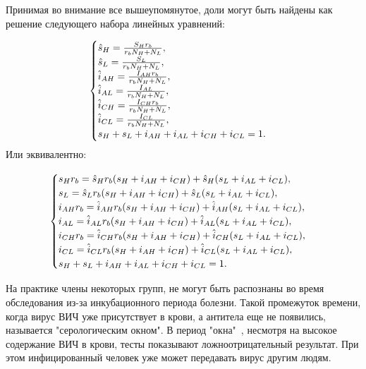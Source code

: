 \documentclass[a4paper]{report}
\begin{document}
	
	Принимая во внимание все вышеупомянутое, доли могут быть найдены как решение следующего набора линейных уравнений:

	\begin{gather}
		\begin{cases}	
	\hat{s}_H = {{{S_H} r_b} \over {r_b N_H + N_L}}, \notag \\
	\hat{s}_L = {{{S_L}} \over {r_b N_H + N_L}}, \notag \\
	\hat{i}_{AH} = {{{I_{AH}} r_b} \over {r_b N_H + N_L}},  \label{restr} \\
	\hat{i}_{AL} = {{{I_{AL}}} \over {r_b N_H + N_L}},  \notag \\
	\hat{i}_{CH} = {{{I_{CH}} r_b} \over {r_b N_H + N_L}},  \notag \\
	\hat{i}_{CL} = {{{I_{CL}}} \over {r_b N_H + N_L}},  \notag \\
	{s}_H + {s}_L + {i}_{AH} + {i}_{AL} + {i}_{CH} + {i}_{CL} = 1. \notag
		\end{cases}
	\end{gather}
	Или эквивалентно:
	
	\begin{gather} \label{restr1}
		\begin{cases}
	s_H r_b	= \hat{s}_H r_b (s_H + i_{AH} +i_{CH}) + \hat{s}_H(s_L + i_{AL} +i_{CL}), \notag \\
	s_L	= \hat{s}_L r_b (s_H + i_{AH} +i_{CH}) + \hat{s}_L(s_L + i_{AL} +i_{CL}), \notag \\
	i_{AH} r_b	= \hat{i}_{AH} r_b (s_H + i_{AH} +i_{CH}) + \hat{i}_{AH}(s_L + i_{AL} +i_{CL}),  \\
	i_{AL} = \hat{i}_{AL} r_b (s_H + i_{AH} +i_{CH}) + \hat{i}_{AL}(s_L + i_{AL} +i_{CL}),  \notag \\
	i_{CH} r_b	= \hat{i}_{CH} r_b (s_H + i_{AH} +i_{CH}) + \hat{i}_{CH}(s_L + i_{AL} +i_{CL}),  \notag \\
	i_{CL} = \hat{i}_{CL} r_b (s_H + i_{AH} +i_{CH}) + \hat{i}_{CL}(s_L + i_{AL} +i_{CL}),  \notag \\
	{s}_H + {s}_L + {i}_{AH} + {i}_{AL} + {i}_{CH} + {i}_{CL} = 1. \notag
		\end{cases}
	\end{gather}
		
		
		
		
	На практике члены некоторых групп, не могут быть распознаны во время обследования из-за инкубационного периода болезни. Такой промежуток времени, когда вирус ВИЧ уже присутствует в крови, а антитела еще не появились, называется "серологическим окном". В период "окна"\ , несмотря на высокое содержание ВИЧ в крови, тесты показывают ложноотрицательный результат. При этом инфицированный человек уже может передавать вирус другим людям.
	
\end{document}
